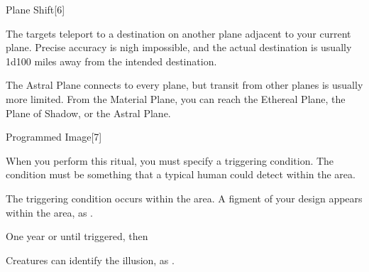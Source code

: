 \begin{spellsection}{Plane Shift}[6]
    \begin{spellheader}
    \end{spellheader}
    \begin{spellcontent}
        \begin{spelltargetinginfo}
        \end{spelltargetinginfo}
        \begin{spelleffects}

            \spelleffect The targets teleport to a destination on another plane adjacent to your current plane. Precise accuracy is nigh impossible, and the actual destination is usually 1d100 miles away from the intended destination.
        \end{spelleffects}
    \end{spellcontent}
    \begin{spellfooter}
        \spellnotes The Astral Plane connects to every plane, but transit from other planes is usually more limited. From the Material Plane, you can reach the Ethereal Plane, the Plane of Shadow, or the Astral Plane.
    \end{spellfooter}
\end{spellsection}

\begin{spellsection}{Programmed Image}[7]
    \begin{spellheader}
    \end{spellheader}
    \begin{spellcontent}
        \begin{spelltargetinginfo}
        \end{spelltargetinginfo}
        \begin{spelleffects}

            \spellspecial When you perform this ritual, you must specify a triggering condition. The condition must be something that a typical human could detect within the area.
            \begin{spelltrigger}{The triggering condition occurs within the area}.
                \spelleffect A figment of your design appears within the area, as .
            \end{spelltrigger}
            \spelldur One year or until triggered, then \durmed
        \end{spelleffects}
    \end{spellcontent}
    \begin{spellfooter}
        \spellnotes Creatures can identify the illusion, as .
    \end{spellfooter}
\end{spellsection}

